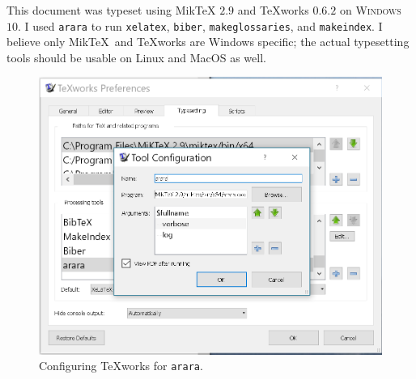 
This document was typeset using Mik\TeX{} $2.9$ \cite{Schenk:2017:Miktex} 
and {\TeX}works $0.6.2$ \cite{KewLoffler:2017:Texworks} 
on \textsc{Windows} $10$. 
I used \texttt{arara} \cite{CeredaEtAl:2021:Arara} 
to run \texttt{xelatex}, \texttt{biber}, \texttt{makeglossaries},  and
\texttt{makeindex}.
I believe only Mik\TeX\  and {\TeX}works are Windows specific; 
the actual typesetting tools should be usable on Linux and MacOS as well.

\begin{figure}[htbp]
\centering
\includegraphics[scale=0.5]{../figs/arara.png}
\caption{Configuring {\TeX}works for \texttt{arara}.}
\label{fig:arara}
\end{figure}
